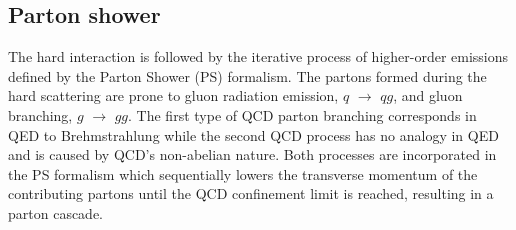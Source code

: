 \subsection{Parton shower} \label{sec::PS}

The hard interaction is followed by the iterative process of higher-order emissions defined by the Parton Shower (PS) formalism.
The partons formed during the hard scattering are prone to gluon radiation emission, $q$ $\rightarrow$ $qg$, and gluon branching, $g$ $\rightarrow$ $gg$. The first type of QCD parton branching corresponds in QED to Brehmstrahlung while the second QCD process has no analogy in QED and is caused by QCD's non-abelian nature. Both processes are incorporated in the PS formalism which sequentially lowers the transverse momentum of the contributing partons until the QCD confinement limit is reached, resulting in a parton cascade.
\\

